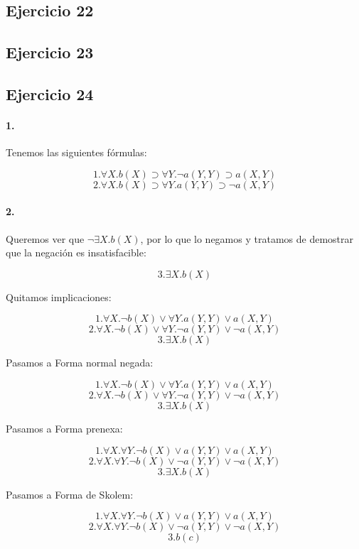 \subsection*{Ejercicio 22}


\subsection*{Ejercicio 23}


\subsection*{Ejercicio 24}

\paragraph{1.} Tenemos las siguientes fórmulas:

\[1. \forall X. b(X) \supset \forall Y. \lnot a(Y,Y) \supset a(X,Y)\]
\[2. \forall X. b(X) \supset \forall Y. a(Y,Y) \supset \lnot a(X,Y)\]

\paragraph{2.} Queremos ver que $\lnot \exists X. b(X)$, por lo que lo negamos y tratamos de demostrar que la negación es insatisfacible:

\[3. \exists X. b(X)\]

Quitamos implicaciones:

\[1. \forall X. \lnot b(X) \lor \forall Y. a(Y,Y) \lor a(X,Y)\]
\[2. \forall X. \lnot b(X) \lor \forall Y. \lnot a(Y,Y) \lor \lnot a(X,Y)\]
\[3. \exists X. b(X)\]

Pasamos a Forma normal negada:

\[1. \forall X. \lnot b(X) \lor \forall Y. a(Y,Y) \lor a(X,Y)\]
\[2. \forall X. \lnot b(X) \lor \forall Y. \lnot a(Y,Y) \lor \lnot a(X,Y)\]
\[3. \exists X. b(X)\]

Pasamos a Forma prenexa:

\[1. \forall X. \forall Y. \lnot b(X) \lor a(Y,Y) \lor a(X,Y)\]
\[2. \forall X. \forall Y. \lnot b(X) \lor \lnot a(Y,Y) \lor \lnot a(X,Y)\]
\[3. \exists X. b(X)\]

Pasamos a Forma de Skolem:

\[1. \forall X. \forall Y. \lnot b(X) \lor a(Y,Y) \lor a(X,Y)\]
\[2. \forall X. \forall Y. \lnot b(X) \lor \lnot a(Y,Y) \lor \lnot a(X,Y)\]
\[3. b(c)\]


